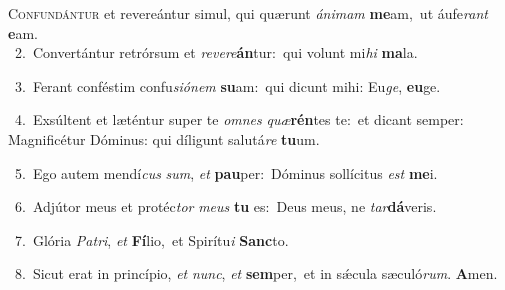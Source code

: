 \lettrine{\initial\textcolor{\initialcolor}{C}}{onfundántur} et revereántur simul, qui quærunt \textit{á}\-\textit{ni}\textit{mam} \textbf{me}\-am,~\star ut áufe\textit{rant} \textbf{e}\-am.\\
{\numbfont\textcolor{\numbcolor}{~2.}}~Convertántur retrórsum et \textit{re}\-\textit{ve}\textit{re}\textbf{án}tur:~\star qui volunt mi\textit{hi} \textbf{ma}\-la.\par
{\numbfont\textcolor{\numbcolor}{~3.}}~Ferant conféstim confu\-\textit{si}\-\textit{ó}\textit{nem} \textbf{su}\-am:~\star qui dicunt mihi: Eu\-\textit{ge}\-, \textbf{eu}\-ge.\par
{\numbfont\textcolor{\numbcolor}{~4.}}~Exsúltent et læténtur super te \textit{om}\-\textit{nes} \textit{quæ}\-\textbf{rén}tes te:~\star et dicant semper: Magnificétur Dóminus: qui díligunt salutá\textit{re} \textbf{tu}\-um.\par
{\numbfont\textcolor{\numbcolor}{~5.}}~Ego autem mendí\textit{cus} \textit{sum}\-, \textit{et} \textbf{pau}\-per:~\star Dóminus sollícitus \textit{est} \textbf{me}\-i.\par
{\numbfont\textcolor{\numbcolor}{~6.}}~Adjútor meus et protéc\textit{tor} \textit{me}\-\textit{us} \textbf{tu} es:~\star Deus meus, ne \textit{tar}\-\textbf{dá}veris.\par
{\numbfont\textcolor{\numbcolor}{~7.}}~Glória \textit{Pa}\-\textit{tri}, \textit{et} \textbf{Fí}\-lio,~\star et Spirítu\textit{i} \textbf{Sanc}\-to.\par
{\numbfont\textcolor{\numbcolor}{~8.}}~Sicut erat in princípio, \textit{et} \textit{nunc}\-, \textit{et} \textbf{sem}\-per,~\star et in sǽcula sæculó\-\textit{rum}\-. \textbf{A}\-men.\par
